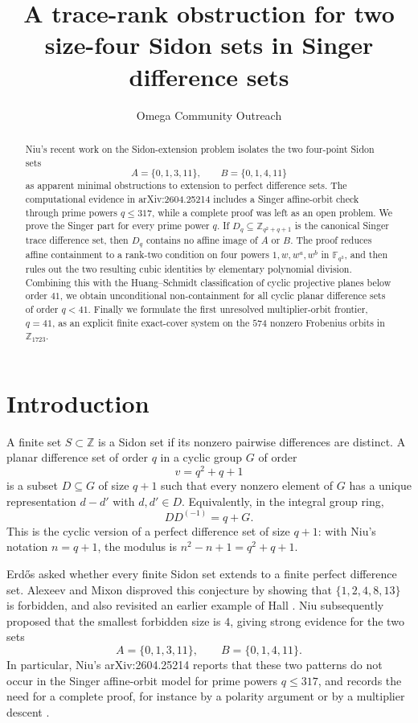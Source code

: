 \documentclass[11pt,letterpaper]{amsart}
\title[A trace-rank obstruction for two size-four Sidon sets]
{A trace-rank obstruction for two size-four Sidon sets in Singer difference sets}
\author{Omega Community Outreach}
\date{}
\theoremstyle{plain}
\newcommand{\F}{\mathbb F}
\newcommand{\Z}{\mathbb Z}
\begin{document}
\begin{abstract}
Niu's recent work on the Sidon-extension problem isolates the two
four-point Sidon sets
\[
 A=\{0,1,3,11\},\qquad B=\{0,1,4,11\}
\]
as apparent minimal obstructions to extension to perfect difference sets.
The computational evidence in arXiv:2604.25214 includes a Singer
affine-orbit check through prime powers \(q\leq 317\), while a complete
proof was left as an open problem.  We prove the Singer part for every
prime power \(q\).  If \(D_q\subseteq \Z_{q^2+q+1}\) is the canonical
Singer trace difference set, then \(D_q\) contains no affine image of
\(A\) or \(B\).  The proof reduces affine containment to a rank-two
condition on four powers \(1,w,w^a,w^b\) in \(\F_{q^3}\), and then rules
out the two resulting cubic identities by elementary polynomial
division.  Combining this with the Huang--Schmidt classification of
cyclic projective planes below order \(41\), we obtain unconditional
non-containment for all cyclic planar difference sets of order
\(q<41\).  Finally we formulate the first unresolved multiplier-orbit
frontier, \(q=41\), as an explicit finite exact-cover system on the
\(574\) nonzero Frobenius orbits in \(\Z_{1723}\).
\end{abstract}

\maketitle

\section{Introduction}

A finite set \(S\subset \Z\) is a Sidon set if its nonzero pairwise
differences are distinct.  A planar difference set of order \(q\) in a
cyclic group \(G\) of order
\[
 v=q^2+q+1
\]
is a subset \(D\subseteq G\) of size \(q+1\) such that every nonzero
element of \(G\) has a unique representation \(d-d'\) with
\(d,d'\in D\).  Equivalently, in the integral group ring,
\[
 DD^{(-1)}=q+G.
\]
This is the cyclic version of a perfect difference set of size \(q+1\):
with Niu's notation \(n=q+1\), the modulus is
\(n^2-n+1=q^2+q+1\).

Erd\H{o}s asked whether every finite Sidon set extends to a finite
perfect difference set.  Alexeev and Mixon disproved this conjecture by
showing that \(\{1,2,4,8,13\}\) is forbidden, and also revisited an
earlier example of Hall \cite{Hall,AlexeevMixon}.  Niu subsequently
proposed that the smallest forbidden size is \(4\), giving strong
evidence for the two sets
\[
 A=\{0,1,3,11\},\qquad B=\{0,1,4,11\}.
\]
In particular, Niu's arXiv:2604.25214 reports that these two patterns
do not occur in the Singer affine-orbit model for prime powers
\(q\leq 317\), and records the need for a complete proof, for instance
by a polarity argument or by a multiplier descent \cite{Niu}.
\end{document}
